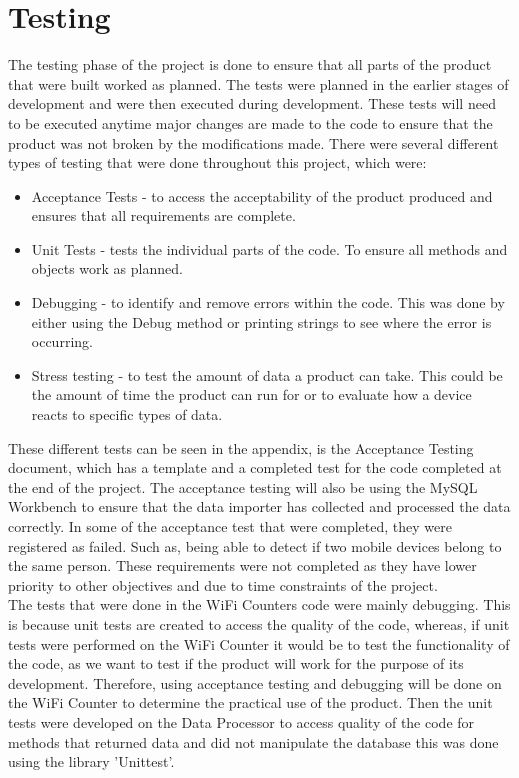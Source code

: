 \documentclass{report}
\begin{document}
\section{Testing}
The testing phase of the project is done to ensure that all parts of the product that were built worked as planned. The tests were planned in the earlier stages of development and were then executed during development. These tests will need to be executed anytime major changes are made to the code to ensure that the product was not broken by the modifications made. There were several different types of testing that were done throughout this project, which were:
\begin{itemize}
    \item Acceptance Tests\cite{AcceptTest} - to access the acceptability of the product produced and ensures that all requirements are complete. 
    \item Unit Tests\cite{UnitTest} -  tests the individual parts of the code. To ensure all methods and objects work as planned.
    \item Debugging - to identify and remove errors within the code. This was done by either using the Debug method or printing strings to see where the error is occurring.
    \item Stress testing - to test the amount of data a product can take. This could be the amount of time the product can run for or to evaluate how a device reacts to specific types of data.
\end{itemize}
These different tests can be seen in the appendix, is the Acceptance Testing document, which has a template and a completed test for the code completed at the end of the project. The acceptance testing will also be using the MySQL Workbench\cite{MySQLWorkbench} to ensure that the data importer has collected and processed the data correctly. In some of the acceptance test that were completed, they were registered as failed. Such as, being able to detect if two mobile devices belong to the same person. These requirements were not completed as they have lower priority to other objectives and due to time constraints of the project.
\\ \newline
The tests that were done in the WiFi Counters code were mainly debugging. This is because unit tests are created to access the quality of the code, whereas, if unit tests were performed on the WiFi Counter it would be to test the functionality of the code, as we want to test if the product will work for the purpose of its development\cite{UnitTestsESP8266}. Therefore, using acceptance testing and debugging will be done on the WiFi Counter to determine the practical use of the product. Then the unit tests were developed on the Data Processor to access quality of the code for methods that returned data and did not manipulate the database this was done using the library 'Unittest'\cite{unittest}.\\ \newline
\end{document}
